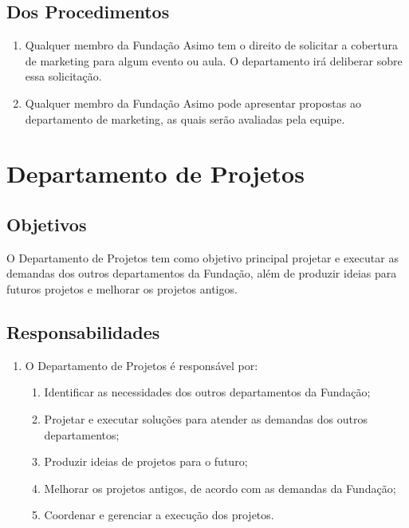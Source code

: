         \subsection{Dos Procedimentos}
            \begin{enumerate}
                \item Qualquer membro da Fundação Asimo tem o direito de solicitar a cobertura de marketing para algum evento ou aula. O departamento irá deliberar sobre essa solicitação.
                \item Qualquer membro da Fundação Asimo pode apresentar propostas ao departamento de marketing, as quais serão avaliadas pela equipe.
            \end{enumerate}
            
    \section{Departamento de Projetos}
        \subsection{Objetivos}
        O Departamento de Projetos tem como objetivo principal projetar e executar as demandas dos outros departamentos da Fundação, além de produzir ideias para futuros projetos e melhorar os projetos antigos.
        
        \subsection{Responsabilidades}
        \begin{enumerate}
            \item O Departamento de Projetos é responsável por:
            \begin{enumerate}
                \item Identificar as necessidades dos outros departamentos da Fundação;
                \item Projetar e executar soluções para atender as demandas dos outros departamentos;
                \item Produzir ideias de projetos para o futuro;
                \item Melhorar os projetos antigos, de acordo com as demandas da Fundação;
                \item Coordenar e gerenciar a execução dos projetos.
            \end{enumerate}
        \end{enumerate}
        
